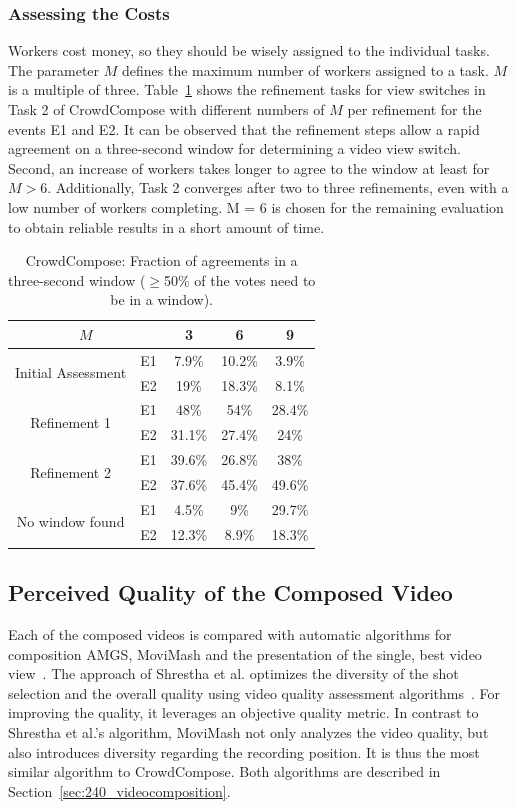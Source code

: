 \subsubsection{Assessing the Costs}
Workers cost money, so they should be wisely assigned to the individual tasks. 
The parameter $M$ defines the maximum number of workers assigned to a task. 
$M$ is a multiple of three. 
Table~\ref{tab:690_t2_refinement} shows the refinement tasks for view switches in Task 2 of CrowdCompose with different numbers of $M$ per refinement for the events E1 and E2. 
It can be observed that the refinement steps allow a rapid agreement on a three-second window for determining a video view switch. 
Second, an increase of workers takes longer to agree to the window at least for $M > 6$. 
Additionally, Task 2 converges after two to three refinements, even with a low number of workers completing. M = 6 is chosen for the remaining evaluation to obtain reliable results in a short amount of time.
\begin{table}
	\centering 
	\caption[CrowdCompose: Fraction of agreements in a three-second window]{CrowdCompose: Fraction of agreements in a three-second window ($\geq$50\% of the votes need to be in a window).}
	\begin{tabular}{ccccc}
		\toprule
		\multicolumn{2}{c}{$M$}& 3 & 6 & 9  \\ 
		\hline 
		\multirow{ 2}{*}{Initial Assessment}  & E1 & 7.9\% & 10.2\% & 3.9\% \\ 
		& E2 & 19\% & 18.3\% & 8.1\% \\ 
		\multirow{ 2}{*}{Refinement 1}  & E1 & 48\% & 54\% & 28.4\% \\ 
		& E2 & 31.1\% & 27.4\% & 24\% \\ 
		\multirow{ 2}{*}{Refinement 2}  & E1 & 39.6\% & 26.8\% & 38\% \\ 
		& E2 & 37.6\% & 45.4\% & 49.6\% \\
		\multirow{ 2}{*}{No window found}  & E1 & 4.5\% & 9\% & 29.7\% \\ 
		& E2 & 12.3\% & 8.9\% & 18.3\% \\
		\bottomrule
	\end{tabular} 
	\label{tab:690_t2_refinement}
\end{table}

\subsection{Perceived Quality of the Composed Video}
\label{sec:690_eval_perceived_quality}
Each of the composed videos is compared with automatic algorithms for composition \ac{AMGS}, MoviMash and the presentation of the single, best video view~\cite{Saini2012,Shrestha2010}.
The approach of Shrestha et al. optimizes the diversity of the shot selection and the overall quality using video quality assessment algorithms~\cite{Shrestha2010}.
For improving the quality, it leverages an objective quality metric.
In contrast to Shrestha et al.'s algorithm, MoviMash not only analyzes the video quality, but also introduces diversity regarding the recording position.
It is thus the most similar algorithm to CrowdCompose.
Both algorithms are described in Section~\ref{sec:240_videocomposition}.

